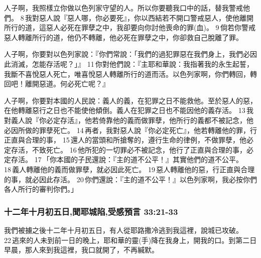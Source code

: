 人子啊，我照樣立你做以色列家守望的人。所以你要聽我口中的話，替我警戒他們。 8 我對惡人說『惡人哪，你必要死』，你以西結若不開口警戒惡人，使他離開所行的道，這惡人必死在罪孽之中，我卻要向你討他喪命的罪(血)。 9 倘若你警戒惡人轉離所行的道，他仍不轉離，他必死在罪孽之中，你卻救自己脫離了罪。


人子啊，你要對以色列家說：『你們常說：「我們的過犯罪惡在我們身上，我們必因此消滅，怎能存活呢？」』 11 你對他們說：『主耶和華說：我指著我的永生起誓，我斷不喜悅惡人死亡，唯喜悅惡人轉離所行的道而活。以色列家啊，你們轉回，轉回吧！離開惡道。何必死亡呢？』


人子啊，你要對本國的人民說：義人的義，在犯罪之日不能救他。至於惡人的惡，在他轉離惡行之日也不能使他傾倒。義人在犯罪之日也不能因他的義存活。 13 我對義人說『你必定存活』，他若倚靠他的義而做罪孽，他所行的義都不被記念，他必因所做的罪孽死亡。 14 再者，我對惡人說『你必定死亡』，他若轉離他的罪，行正直與合理的事， 15 還人的當頭和所搶奪的，遵行生命的律例，不做罪孽，他必定存活，不致死亡。 16 他所犯的一切罪必不被記念，他行了正直與合理的事，必定存活。
17 「你本國的子民還說：『主的道不公平！』其實他們的道不公平。 18 義人轉離他的義而做罪孽，就必因此死亡。 19 惡人轉離他的惡，行正直與合理的事，就必因此存活。 20 你們還說：『主的道不公平！』以色列家啊，我必按你們各人所行的審判你們。」


\subsubsection{十二年十月初五日,聞耶城陷,受感預言 33:21-33}
我們被擄之後十二年十月初五日，有人從耶路撒冷逃到我這裡，說城已攻破。 22 逃來的人未到前一日的晚上，耶和華的靈(手)降在我身上，開我的口。到第二日早晨，那人來到我這裡，我口就開了，不再緘默。


